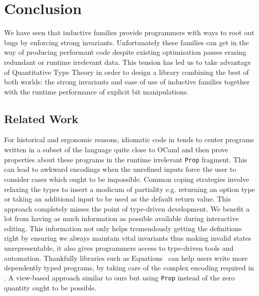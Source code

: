 

\section{Conclusion}\label{sec:conclusion}

We have seen that inductive families provide programmers with ways to root out bugs
by enforcing strong invariants. Unfortunately these families can get in the way of
producing performant code despite existing optimisation passes erasing redundant
or runtime irrelevant data.
%
This tension has led us to take advantage of Quantitative Type Theory
in order to design a library
combining the best of both worlds: the strong invariants and ease of use of inductive
families together with the runtime performance of explicit bit manipulations.

\subsection{Related Work}

For historical and ergonomic reasons, idiomatic code in \coq{} tends to center programs
written in a subset of the language quite close to OCaml and then prove properties
about these programs in the runtime irrelevant \texttt{Prop} fragment.
%
This can lead to awkward encodings when the unrefined inputs force the user to consider
cases which ought to be impossible. Common coping strategies involve relaxing the types
to insert a modicum of partiality e.g. returning an option type or taking an additional
input to be used as the default return value.
%
This approach completely misses the point of type-driven development.
%
We benefit a lot from having as much information as possible available during
interactive editing.
%
This information not only helps tremendously getting the definitions right by
ensuring we always maintain vital invariants thus making invalid states
unrepresentable, it also gives programmers access to type-driven tools and automation.
%
Thankfully libraries such as Equations~\cite{DBLP:conf/itp/Sozeau10,DBLP:journals/pacmpl/SozeauM19}
can help users write more dependently typed programs, by taking care of the complex
encoding required in \coq{}. A view-based approach similar to ours but using \texttt{Prop}
instead of the zero quantity ought to be possible.

